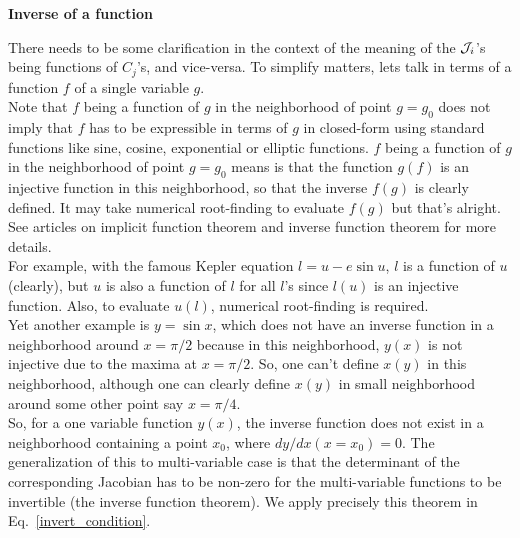 \begin{definition}[label=def:C3]

\begin{center}
\textbf{Inverse of a function}
\end{center}

There needs to be some clarification in the context of 
the meaning of the $\mathcal{J}_i$'s being functions of $C_j$'s, 
and vice-versa. To simplify matters, lets talk in terms of 
a function $f$ of  a single variable $g$.\\


Note that $f$ being  a function of $g$ in the neighborhood
of point $g=g_0$ does not imply that 
$f$ has to be expressible in terms of $g$ in closed-form
using standard functions like sine, cosine, exponential or elliptic functions.
$f$ being  a function of $g$ in the neighborhood
of point $g=g_0$ means is that the function
$g(f)$ is an injective function in this neighborhood, so that
the inverse $f(g)$ is clearly defined. It may take numerical
root-finding to evaluate $f(g)$ but that's alright. 
See articles on implicit function theorem and inverse 
function theorem for more details. \\



For example, with the famous Kepler equation $l = u - e \sin u$,
$l$ is a function of $u$ (clearly), but $u$ is also a function of $l$
for all $l$'s since $l(u)$ is an injective function. Also, 
to evaluate $u(l)$, numerical root-finding is required. \\


Yet another example is $y= \sin x$, which does not have an inverse function
in a neighborhood around $x= \pi/2$ because in this neighborhood, 
$y(x)$ is not injective due to the maxima at $x= \pi/2$. So, one can't 
define $x(y)$ in this neighborhood, although one can clearly define 
$x(y)$ in small neighborhood around some other point say $x = \pi/4$.\\


So, for a one variable function $y(x)$,
 the inverse function does not exist in a 
neighborhood containing  a point $x_0$, where $dy/dx(x=x_0) = 0$. The 
generalization of this to multi-variable case is that the determinant
of the corresponding Jacobian has to be non-zero for the multi-variable
functions to be invertible (the inverse function theorem).
We apply precisely this theorem in Eq.~\eqref{invert_condition}.


\end{definition}

